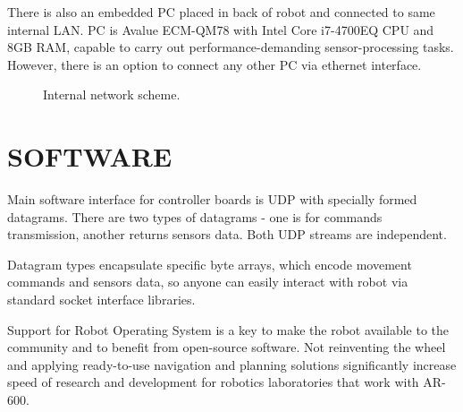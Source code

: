 \documentclass[letterpaper, 10 pt, conference]{ieeeconf}  %
\begin{document}
There is also an embedded PC placed in back of robot and connected to same internal LAN. PC is
Avalue ECM-QM78 with Intel Core i7-4700EQ CPU and 8GB RAM, capable to carry out
performance-demanding sensor-processing tasks. However, there is an option to
connect any other PC via ethernet interface.

\begin{figure}[thpb]
\caption{Internal network scheme.}
\label{img:network}
\end{figure}  

\section{SOFTWARE}

Main software interface for controller boards is UDP with specially formed
datagrams. There are two types of datagrams - one is for commands transmission,
another returns sensors data. Both UDP streams are independent.

Datagram types encapsulate specific byte arrays, which encode movement
commands and sensors data, so anyone can easily interact with robot via standard
socket interface libraries.

Support for Robot Operating System \cite{c2} is a key to make the robot
available to the community and to benefit from open-source software. Not
reinventing the wheel and applying ready-to-use navigation and planning
solutions significantly increase speed of research and development for robotics
laboratories that work with AR-600.
\end{document}
